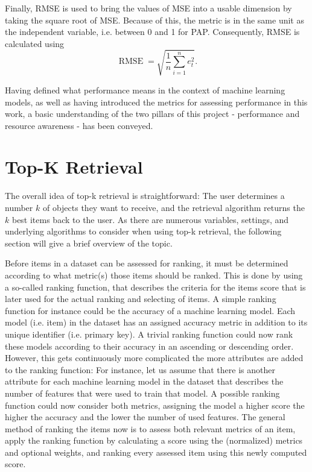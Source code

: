 Finally, RMSE is used to bring the values of MSE into a usable dimension by taking the square root of MSE. Because of this, the metric is in the same unit as the independent variable, i.e. between 0 and 1 for PAP. Consequently, RMSE is calculated using
\begin{equation}
\operatorname{RMSE} = \sqrt{\frac{1}{n} \sum_{i=1}^n e_t^2 }.
\label{rmse}
\end{equation}


Having defined what performance means in the context of machine learning models, as well as having introduced the metrics for assessing performance in this work, a basic understanding of the two pillars of this project - performance and resource awareness - has been conveyed. 



\section{Top-K Retrieval}\label{sec:topk}

The overall idea of top-k retrieval is straightforward: The user determines a number $k$ of objects they want to receive, and the retrieval algorithm returns the $k$ best items back to the user. As there are numerous variables, settings, and underlying algorithms to consider when using top-k retrieval, the following section will give a brief overview of the topic. 

Before items in a dataset can be assessed for ranking, it must be determined according to what metric(s) those items should be ranked. This is done by using a so-called ranking function, that describes the criteria for the items score that is later used for the actual ranking and selecting of items. A simple ranking function for instance could be the accuracy of a machine learning model. Each model (i.e. item) in the dataset has an assigned accuracy metric in addition to its unique identifier (i.e. primary key). A trivial ranking function could now rank these models according to their accuracy in an ascending or descending order. However, this gets continuously more complicated the more attributes are added to the ranking function: For instance, let us assume that there is another attribute for each machine learning model in the dataset that describes the number of features that were used to train that model. A possible ranking function could now consider both metrics, assigning the model a higher score the higher the accuracy and the lower the number of used features. The general method of ranking the items now is to assess both relevant metrics of an item, apply the ranking function by calculating a score using the (normalized) metrics and optional weights, and ranking every assessed item using this newly computed score. 

